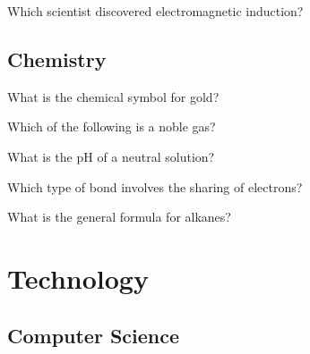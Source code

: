 \documentclass[12pt,a4paper]{book}
\begin{document}
\begin{enhancedmcq}[Electromagnetism]{Which scientist discovered electromagnetic induction?}
\end{enhancedmcq}

\section{Chemistry}

\begin{enhancedmcq}{What is the chemical symbol for gold?}
\end{enhancedmcq}

\begin{enhancedmcq}{Which of the following is a noble gas?}
\end{enhancedmcq}

\begin{enhancedmcq}{What is the pH of a neutral solution?}
\end{enhancedmcq}

\begin{enhancedmcq}{Which type of bond involves the sharing of electrons?}
\end{enhancedmcq}

\begin{enhancedmcq}{What is the general formula for alkanes?}
\end{enhancedmcq}

\chapter{Technology}
\section{Computer Science}
\end{document}

